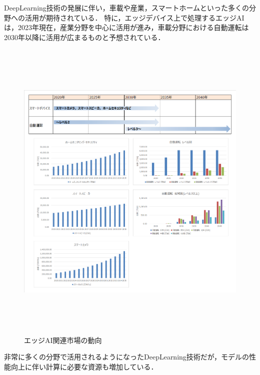 DeepLearning技術の発展に伴い，車載や産業，スマートホームといった多くの分野への活用が期待されている．
特に，エッジデバイス上で処理するエッジAIは，2023年現在，産業分野を中心に活用が進み，車載分野における自動運転は2030年以降に活用が広まるものと予想されている．

\begin{figure} [H]
	\begin{center}
		\includegraphics[clip, height=15cm, bb=-100 0 957 911]{data/figure/edge_ai_market.png}
		\caption{エッジAI関連市場の動向}
		\label{edge_ai_market}
	\end{center}
\end{figure}




非常に多くの分野で活用されるようになったDeepLearning技術だが，モデルの性能向上に伴い計算に必要な資源も増加している．


